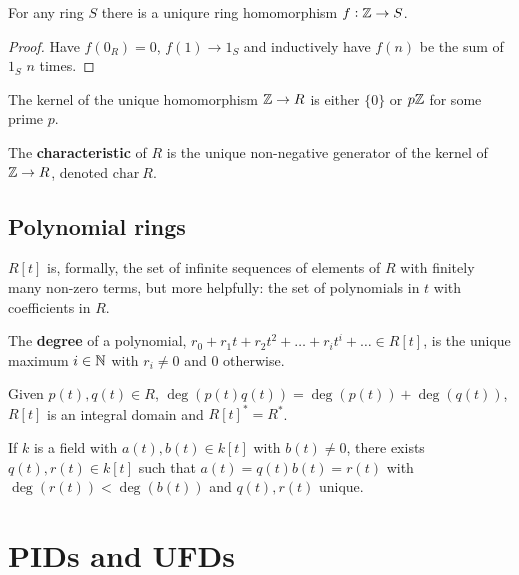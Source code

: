 \documentclass[../Year2.tex]{subfiles}
\begin{document}
\begin{lemma}
    For any ring $S$ there is a uniqure ring homomorphism $f:\mathbb{Z}\rightarrow S$.
    \begin{proof}
        Have $f(0_R)=0$, $f(1)\rightarrow 1_S$ and inductively have $f(n)$ be the sum of $1_S$ $n$ times.
    \end{proof}
\end{lemma}

\begin{lemma}
    The kernel of the unique homomorphism $\mathbb{Z}\rightarrow R$ is either $\{0\}$ or $p\mathbb{Z}$ for some prime $p$.
\end{lemma}

\begin{definition}[Charateristic]
    The \textbf{characteristic} of $R$ is the unique non-negative generator of the kernel of $\mathbb{Z}\rightarrow R$, denoted $\text{char}\ R$.
\end{definition}

\subsection{Polynomial rings}

\begin{definition}
    $R[t]$ is, formally, the set of infinite sequences of elements of $R$ with finitely many non-zero terms, but more helpfully: the set of polynomials in $t$ with coefficients in $R$.
\end{definition}

\begin{definition}
    The \textbf{degree} of a polynomial, $r_0 + r_1t + r_2t^2 + \ldots + r_i t^i + \ldots \in R[t]$, is the unique maximum $i\in\mathbb{N}$ with $r_i\neq 0$ and $0$ otherwise.
\end{definition}

\begin{lemma}
    Given $p(t),q(t)\in R$, $\deg(p(t)q(t))=\deg(p(t))+\deg(q(t))$, $R[t]$ is an integral domain and $R[t]^* = R^*$.
\end{lemma}

\begin{theorem}
    If $k$ is a field with $a(t),b(t)\in k[t]$ with $b(t)\neq 0$, there exists $q(t),r(t)\in k[t]$ such that $a(t)=q(t)b(t)=r(t)$ with $\deg(r(t))<\deg(b(t))$ and $q(t),r(t)$ unique.
\end{theorem}

\section{PIDs and UFDs}
\end{document}
